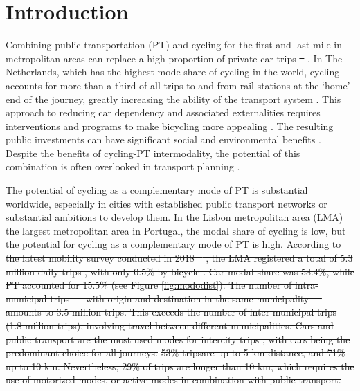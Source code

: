 \documentclass[review, doubleblind, 3p,
authoryear]{elsarticle} %
\providecommand{\DIFaddtex}[1]{{\protect\color{green}{#1}}} %
\providecommand{\DIFdeltex}[1]{{\protect\color{red}\sout{#1}}}                      %
\providecommand{\DIFaddbegin}{} %
\providecommand{\DIFaddend}{} %
\providecommand{\DIFdelbegin}{} %
\providecommand{\DIFdelend}{} %
\providecommand{\DIFadd}[1]{\texorpdfstring{\DIFaddtex{#1}}{#1}} %
\providecommand{\DIFdel}[1]{\texorpdfstring{\DIFdeltex{#1}}{}} %
\newcommand{\DIFscaledelfig}{0.5}
\newlength{\DIFdelgraphicswidth} %
\newlength{\DIFdelgraphicsheight} %
\newcommand{\DIFaddincludegraphics}[2][]{{\color{blue}\fbox{\DIFOincludegraphics[#1]{#2}}}} %
\newcommand{\DIFdelincludegraphics}[2][]{%
\sbox{\DIFdelgraphicsbox}{\DIFOincludegraphics[#1]{#2}}%
\settoboxwidth{\DIFdelgraphicswidth}{\DIFdelgraphicsbox} %
\settoboxtotalheight{\DIFdelgraphicsheight}{\DIFdelgraphicsbox} %
\scalebox{\DIFscaledelfig}{%
\parbox[b]{\DIFdelgraphicswidth}{\usebox{\DIFdelgraphicsbox}\\[-\baselineskip] \rule{\DIFdelgraphicswidth}{0em}}\llap{\resizebox{\DIFdelgraphicswidth}{\DIFdelgraphicsheight}{%
\setlength{\unitlength}{\DIFdelgraphicswidth}%
\begin{picture}(1,1)%
\thicklines\linethickness{2pt} %
{\color[rgb]{1,0,0}\put(0,0){\framebox(1,1){}}}%
{\color[rgb]{1,0,0}\put(0,0){\line( 1,1){1}}}%
{\color[rgb]{1,0,0}\put(0,1){\line(1,-1){1}}}%
\end{picture}%
}\hspace*{3pt}}} %
} %
\DeclareRobustCommand{\DIFaddbegin}{\DIFOaddbegin \let\includegraphics\DIFaddincludegraphics} %
\DeclareRobustCommand{\DIFaddend}{\DIFOaddend \let\includegraphics\DIFOincludegraphics} %
\DeclareRobustCommand{\DIFdelbegin}{\DIFOdelbegin \let\includegraphics\DIFdelincludegraphics} %
\DeclareRobustCommand{\DIFdelend}{\DIFOaddend \let\includegraphics\DIFOincludegraphics} %
\begin{document}
\begin{frontmatter}
 \end{frontmatter}

\hypersetup{citecolor=black}

\section{Introduction}\label{introduction}

Combining public transportation (PT) and cycling for the first and last
mile in metropolitan areas can replace a high proportion of private car
trips \DIFdelbegin \DIFdel{\mbox{%
\citep{MARTENS2007326}}\hspace{0pt}%
}\DIFdelend \DIFaddbegin \DIFadd{\mbox{%
\citep{MARTENS2007326, vanmil_insights_2021}}\hspace{0pt}%
}\DIFaddend . In The Netherlands,
which has the highest mode share of cycling in the world, cycling
accounts for more than a third of all trips to and from rail stations at
the `home' end of the journey, greatly increasing the ability of the
transport system \citep{RIETVELD200071}. This approach to reducing car
dependency and associated externalities requires interventions and
programs to make bicycling more appealing \citep{lapaix_role_2021}. The
resulting public investments can have significant social and
environmental benefits
\citep{internationaltransportforum_integrating_2017}. Despite the
benefits of cycling-PT intermodality, the potential of this combination
is often overlooked in transport planning \citep{lapaix_role_2021}.

The potential of cycling as a complementary mode of PT is substantial
worldwide, especially in cities with established public transport
networks or substantial ambitions to develop them. In the Lisbon
metropolitan area (LMA) the largest metropolitan area in Portugal, the
modal share of cycling is low, but the potential for cycling as a
complementary mode of PT is high.
\DIFdelbegin \DIFdel{According to the latest mobility
survey conducted in 2018 \mbox{%
\citep{IMOB}}\hspace{0pt}%
,
the LMA registered a total of 5.3
million daily trips , with only 0.5\% by bicycle
. Car modal share was
58.4\%, while PT accounted for 15.5\% (see Figure \ref{fig:mododist}).
The number of intra-municipal trips --- with origin and destination in
the same municipality --- amounts to 3.5 million trips. This exceeds the
number of inter-municipal trips (1.8 million trips), involving travel
between different municipalities. Cars and public transport are the most
used modes for intercity trips , with cars being the predominant choice
for
all journeys.}%
\DIFdel{53\% tripsare up to 5 km distance, and 71\% up to 10 km. Nevertheless,
29\% of trips are longer than 10 km, which requires the use of motorized
modes, or active modes in combination with public transport.
}\DIFdelend 
\end{document}
